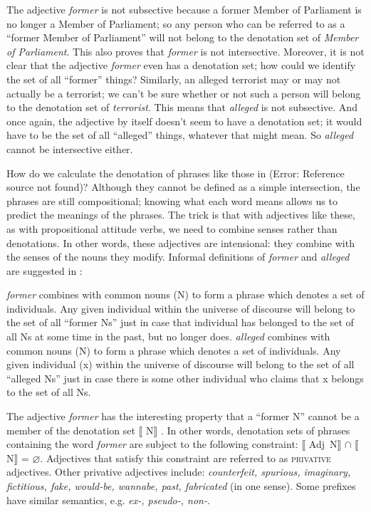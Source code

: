 The adjective \textit{former} is not subsective because a former Member of Parliament is no longer a Member of Parliament; so any person who can be referred to as a “former Member of Parliament” will not belong to the denotation set of \textit{Member of Parliament}. This also proves that \textit{former} is not intersective. Moreover, it is not clear that the adjective \textit{former} even has a denotation set; how could we identify the set of all “former” things? Similarly, an alleged terrorist may or may not actually be a terrorist; we can’t be sure whether or not such a person will belong to the denotation set of \textit{terrorist}. This means that \textit{alleged} is not subsective. And once again, the adjective by itself doesn’t seem to have a denotation set; it would have to be the set of all “alleged” things, whatever that might mean. So \textit{alleged} cannot be intersective either.



How do we calculate the denotation of phrases like those in (Error: Reference source not found)? Although they cannot be defined as a simple intersection, the phrases are still compositional; knowing what each word means allows us to predict the meanings of the phrases. The trick is that with adjectives like these, as with propositional attitude verbs, we need to combine senses rather than denotations. In other words, these adjectives are intensional: they combine with the senses of the nouns they modify. Informal definitions of \textit{former} and \textit{alleged} are suggested in :


\ea
\ea  \textit{former} combines with common nouns (N) to form a phrase which denotes a set of individuals. Any given individual within the universe of discourse will belong to the set of all “former Ns” just in case that individual has belonged to the set of all Ns at some time in the past, but no longer does.
\ex  \textit{alleged} combines with common nouns (N) to form a phrase which denotes a set of individuals. Any given individual (x) within the universe of discourse will belong to the set of all “alleged Ns” just in case there is some other individual who claims that x belongs to the set of all Ns.
\z \z


The adjective \textit{former} has the interesting property that a “former N” cannot be a member of the denotation set $\llbracket$ N$\rrbracket$ . In other words, denotation sets of phrases containing the word \textit{former} are subject to the following constraint: $\llbracket$ Adj~N$\rrbracket$  ${\cap}$ $\llbracket$ N$\rrbracket$  = ⌀. Adjectives that satisfy this constraint are referred to as \textsc{privative} adjectives. Other privative adjectives include: \textit{counterfeit, spurious, imaginary, fictitious, fake, would-be, wannabe, past, fabricated} (in one sense). Some prefixes have similar semantics, e.g. \textit{ex-, pseudo-, non-}.



